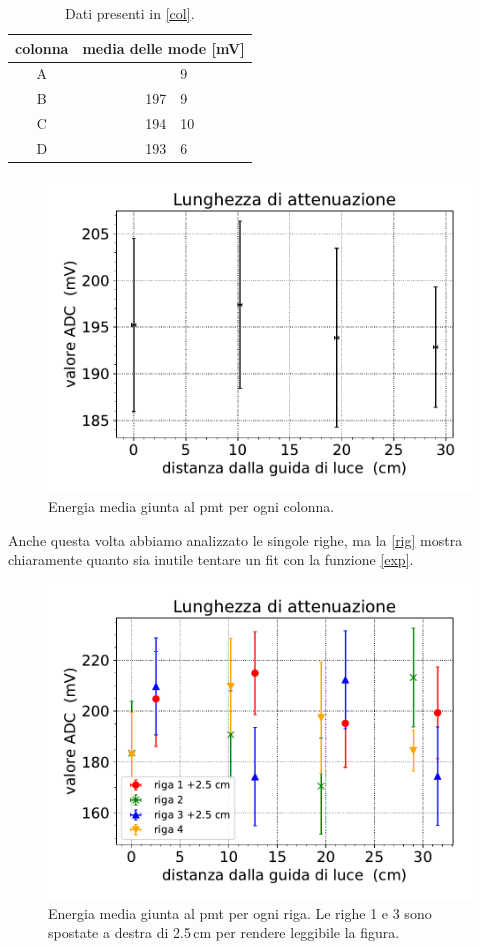 \begin{table}[h]
\centering
\begin{tabular}{| c | r @{$\,\pm\,$} l |}
\hline
colonna & \multicolumn{2}{c|}{media delle mode [mV]} \\
\hline
A & \qquad \quad 195&9 \\
B & 197&9 \\
C & 194&10 \\
D & 193&6 \\
\hline
\end{tabular}
\caption{Dati presenti in \autoref{col}.}
\label{tab:ADC}
\end {table}

\begin{figure}[h]
\centering
\includegraphics[width=8 cm]{ecol}
\caption{Energia media giunta al pmt per ogni colonna.}
\label{col}
\end{figure}


Anche questa volta abbiamo analizzato le singole righe, ma la \autoref{rig} mostra chiaramente quanto sia inutile tentare un fit con la funzione \eqref{exp}. 

\begin{figure}[h]
\centering
\includegraphics[width=8 cm]{erig}
\caption{Energia media giunta al pmt per ogni riga.
Le righe 1 e 3 sono spostate a destra di 2.5\,cm per rendere leggibile la figura.}
\label{rig}
\end{figure}


